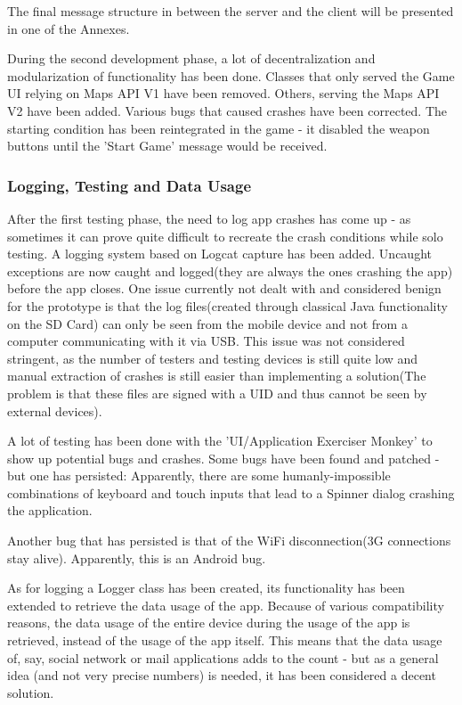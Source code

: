 \documentclass{article}
\begin{document}
The final message structure in between the server and the client will be
presented in one of the Annexes.\newline

During the second development phase, a lot of decentralization and
modularization of functionality has been done. Classes that only served the
Game UI relying on Maps API V1 have been removed. Others, serving the Maps API
V2 have been added. Various bugs that caused crashes have been corrected. The
starting condition has been reintegrated in the game - it disabled the weapon
buttons until the 'Start Game' message would be received.\newline

\subsubsection{Logging, Testing and Data Usage}
After the first testing phase, the need to log app crashes has come up - as
sometimes it can prove quite difficult to recreate the crash conditions while
solo testing. A logging system based on Logcat capture has been added. Uncaught
exceptions are now caught and logged(they are always the ones crashing the app)
before the app closes. One issue currently not dealt with and considered
benign for the prototype is that the log files(created through classical Java
functionality on the SD Card) can only be seen from the mobile device and not
from a computer communicating with it via USB. This issue was not considered
stringent, as the number of testers and testing devices is still quite low and
manual extraction of crashes is still easier than implementing a solution(The
problem is that these files are signed with a UID and thus cannot be seen by
external devices).\newline

A lot of testing has been done with the 'UI/Application Exerciser Monkey' to
show up potential bugs and crashes. Some bugs have been found and patched - but
one has persisted: Apparently, there are some humanly-impossible combinations of
keyboard and touch inputs that lead to a Spinner dialog crashing the
application. \newline

Another bug that has persisted is that of the WiFi disconnection(3G connections
stay alive). Apparently, this is an Android bug.\newline

As for logging a Logger class has been created, its functionality has been
extended to retrieve the data usage of the app. Because of various compatibility
reasons, the data usage of the entire device during the usage of the app is
retrieved, instead of the usage of the app itself. This means that the data
usage of, say, social network or mail applications adds to the count - but as a
general idea (and not very precise numbers) is needed, it has been considered a
decent solution.
\end{document}
